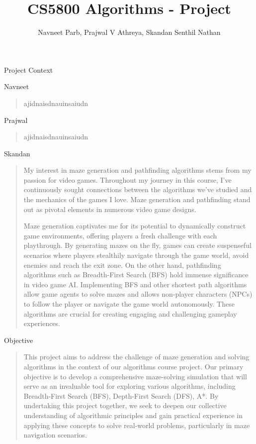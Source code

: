 \documentclass{amsart}
\author{Navneet Parb, Prajwal V Athreya, Skandan Senthil Nathan}
\title{CS5800 Algorithms - Project}
\begin{document}
\maketitle

\begin{section}{Project Context}

    \begin{subsection}{Navneet}
        \begin{quote}
            ajidnaisdnauinsaiudn    
        \end{quote}
    \end{subsection}

    \begin{subsection}{Prajwal}
        \begin{quote}
            ajidnaisdnauinsaiudn    
        \end{quote}
    \end{subsection}

    \begin{subsection}{Skandan}
        \begin{quote}
            My interest in maze generation and pathfinding algorithms stems from my passion for video games. Throughout my journey in this course, I've continuously sought connections between the algorithms we've studied and the mechanics of the games I love. Maze generation and pathfinding stand out as pivotal elements in numerous video game designs.

            Maze generation captivates me for its potential to dynamically construct game environments, offering players a fresh challenge with each playthrough. By generating mazes on the fly, games can create suspenseful scenarios where players stealthily navigate through the game world, avoid enemies and reach the exit zone. On the other hand, pathfinding algorithms such as Breadth-First Search (BFS) hold immense significance in video game AI. Implementing BFS and other shortest path algorithms allow game agents to solve mazes and allows non-player characters (NPCs) to follow the player or navigate the game world autonomously. These algorithms are crucial for creating engaging and challenging gameplay experiences.    
        \end{quote}
    \end{subsection}
    
\end{section}

\begin{section}{Objective}
    \begin{quote}
        This project aims to address the challenge of maze generation and solving algorithms in the context of our algorithms course project. Our primary objective is to develop a comprehensive maze-solving simulation that will serve as an invaluable tool for exploring various algorithms, including Breadth-First Search (BFS), Depth-First Search (DFS), A*. By undertaking this project together, we seek to deepen our collective understanding of algorithmic principles and gain practical experience in applying these concepts to solve real-world problems, particularly in maze navigation scenarios.
    \end{quote}
\end{section}
\end{document}
